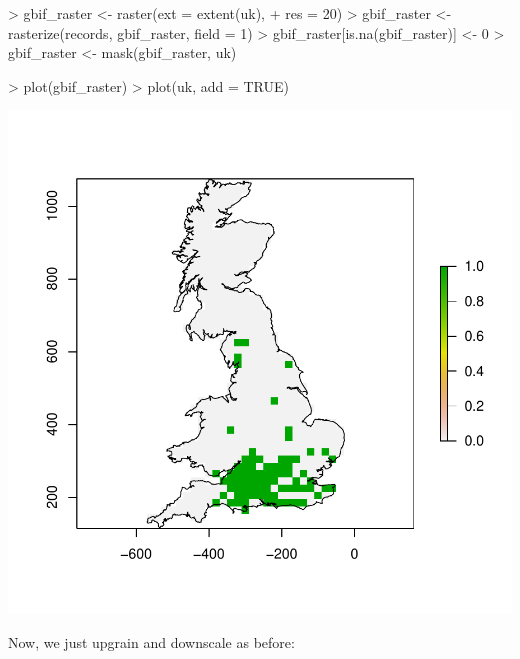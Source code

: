 \documentclass{article}[12pt, a4paper]
\begin{document}
\begin{Schunk}
\begin{Sinput}
> gbif_raster <- raster(ext = extent(uk),
+                       res = 20)
> gbif_raster <- rasterize(records, gbif_raster, field = 1)
> gbif_raster[is.na(gbif_raster)] <- 0
> gbif_raster <- mask(gbif_raster, uk)
\end{Sinput}
\end{Schunk}
\begin{Schunk}
\begin{Sinput}
> plot(gbif_raster)
> plot(uk, add = TRUE)
\end{Sinput}
\end{Schunk}
\includegraphics{Downscaling-downscale40}

Now, we just upgrain and downscale as before:
\end{document}
